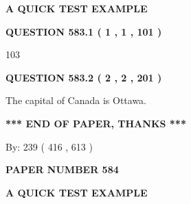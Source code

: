 \documentclass[12pt]{article}
\begin{document}
   
   
   
 \vspace{0.2in}
{\LARGE {\textbf{ A QUICK TEST EXAMPLE}}}
   
   
  
\vspace{0.2in}
  
{\textbf{\Large{QUESTION
583.1 
 ( 1 , 1 , 101 )
}}}
  
  
 
 
\noindent{}

103
 
 
  
\vspace{0.2in}
  
{\textbf{\Large{QUESTION
583.2 
 ( 2 , 2 , 201 )
}}}
  
  
 
 
\noindent{}
 
 
The capital of Canada is Ottawa.
 
 
 
 
   
   
 \vspace{0.2in}
 
   
   
   
   
\vspace{1.0in} 
{\textbf{\large{ *** END OF PAPER, THANKS *** }}} 
   
   
\hspace{1.0in} By: 
 239 ( 416 ,  613 )
   
   
   
   
\newpage 
\setcounter{page}{ 
   584001 } 
   
   
   
   
 {\textbf{ \Large{ PAPER NUMBER  584  }}}
   
   
\vspace{0.2in}
   
   
   
   
   
   
 \vspace{0.2in}
{\LARGE {\textbf{ A QUICK TEST EXAMPLE}}}
   
   
  
\vspace{0.2in}
  
\end{document}

